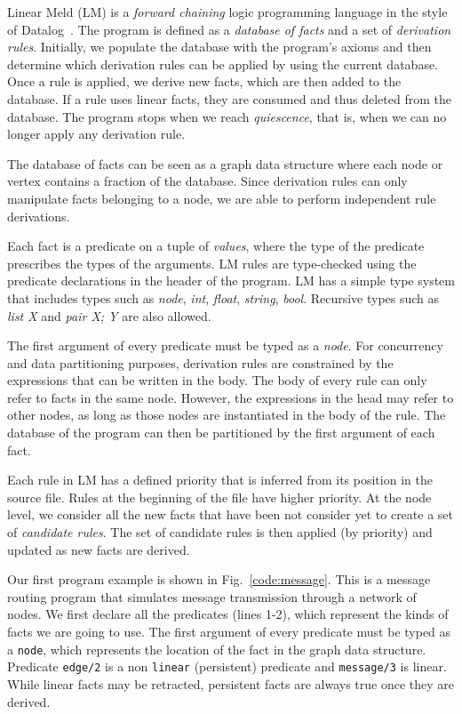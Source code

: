 
Linear Meld (LM) is a \emph{forward chaining} logic programming language in the style of Datalog~\cite{Ullman:1990:PDK:533142}. The program is defined as a \emph{database of facts} and a set of \emph{derivation rules}.
Initially, we populate the database with the program's axioms and then determine which derivation rules can be applied by using the current database. Once a rule is applied, we derive new facts, which are then added to the database.
If a rule uses linear facts, they are consumed and thus deleted from the database.
The program stops when we reach \emph{quiescence}, that is, when we can no longer
apply any derivation rule.

The database of facts can be seen as a graph data structure where each node or vertex contains a
fraction of the database.  Since derivation rules can only manipulate facts belonging to
a node, we are able to perform independent rule derivations.

Each fact is a predicate on a tuple of \emph{values}, where the type of the predicate prescribes the types of the arguments.
LM rules are type-checked using the predicate declarations in the header of the program. LM has a simple type system that includes types such as
\emph{node}, \emph{int}, \emph{float}, \emph{string}, \emph{bool}. Recursive types such as \emph{list X} and \emph{pair X; Y} are
also allowed.

The first argument of every predicate must be typed as a \emph{node}.
For concurrency and data partitioning purposes, derivation rules are constrained by the expressions that can be written in the body.
The body of every rule can only refer to facts in the same node.
However, the expressions in the head may refer to other nodes, as long as those nodes are instantiated in the body of the rule.
The database of the program can then be partitioned by the first argument of each fact.

Each rule in LM has a defined priority that is inferred from its position in the source file.
Rules at the beginning of the file have higher priority. At the node level, we consider all
the new facts that have been not consider yet to create a set of \emph{candidate rules}.
The set of candidate rules is then applied (by priority) and updated as new facts are derived.

Our first program example is shown in Fig.~\ref{code:message}. This is a message routing program
that simulates message transmission through a network of nodes.
We first declare all the predicates (lines 1-2), which represent the kinds of facts we are going to
use. The first argument of every predicate must be typed as a \texttt{node}, which represents the location of the fact in
the graph data structure.
Predicate \texttt{edge/2} is a non \texttt{linear} (persistent) predicate and \texttt{message/3} is linear. While linear facts may be retracted, persistent facts are always
true once they are derived.

